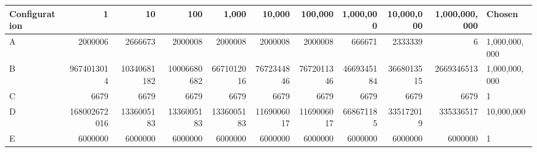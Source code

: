 \begin{tabular}{lrrrrrrrrrl}
\toprule
Configuration & 1 & 10 & 100 & 1,000 & 10,000 & 100,000 & 1,000,000 & 10,000,000 & 1,000,000,000 & Chosen \\
\midrule
A & 2000006 & 2666673 & 2000008 & 2000008 & 2000008 & 2000008 & 666671 & 2333339 & 6 & 1,000,000,000 \\
B & 9674013014 & 10340681182 & 10006680682 & 6671012016 & 7672344846 & 7672011346 & 4669345184 & 3668013515 & 2669346513 & 1,000,000,000 \\
C & 6679 & 6679 & 6679 & 6679 & 6679 & 6679 & 6679 & 6679 & 6679 & 1 \\
D & 168002672016 & 1336005183 & 1336005183 & 1336005183 & 1169006017 & 1169006017 & 668671185 & 335172019 & 335336517 & 10,000,000 \\
E & 6000000 & 6000000 & 6000000 & 6000000 & 6000000 & 6000000 & 6000000 & 6000000 & 6000000 & 1 \\
\bottomrule
\end{tabular}
